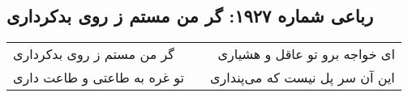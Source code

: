 \begin{center}
\section*{رباعی شماره ۱۹۲۷: گر من مستم ز روی بدکرداری}
\label{sec:1927}
\begin{longtable}{l p{0.5cm} r}
گر من مستم ز روی بدکرداری
&&
ای خواجه برو تو عاقل و هشیاری
\\
تو غره به طاعتی و طاعت داری
&&
این آن سر پل نیست که می‌پنداری
\\
\end{longtable}
\end{center}
